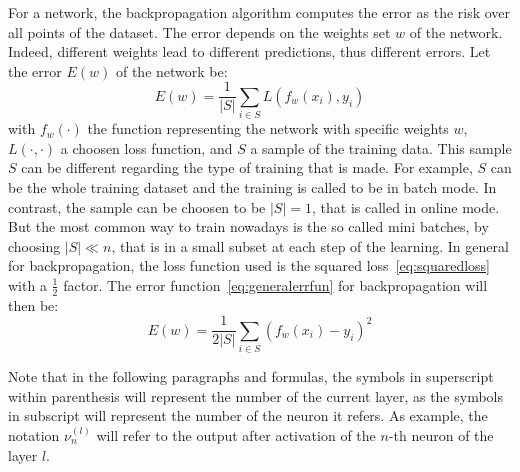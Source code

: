 For a network, the backpropagation algorithm computes the error as the risk over all points of the dataset. The error depends on the weights set $w$ of the network. Indeed, different weights lead to different predictions, thus different errors. Let the error $E(w)$ of the network be:
\begin{equation}
  \label{eq:generalerrfun}
  E(w) = \frac{1}{|S|}\sum_{i \in S} L(f_w(x_i), y_i)
\end{equation}
with $f_w(\cdot)$ the function representing the network with specific weights $w$, $L(\cdot, \cdot)$ a choosen loss function, and $S$ a sample of the training data. This sample $S$ can be different regarding the type of training that is made. For example, $S$ can be the whole training dataset and the training is called to be in batch mode. In contrast, the sample can be choosen to be $|S| = 1$, that is called in online mode. But the most common way to train nowadays is the so called mini batches, by choosing $|S| \ll n$, that is in a small subset at each step of the learning. In general for backpropagation, the loss function used is the squared loss~\eqref{eq:squaredloss} with a $\frac{1}{2}$ factor. The error function~\eqref{eq:generalerrfun} for backpropagation will then be:
\begin{equation}
  \label{eq:backerrorfunction}
  E(w) = \frac{1}{2|S|}\sum_{i \in S} (f_w(x_i) - y_i)^2
\end{equation}

Note that in the following paragraphs and formulas, the symbols in superscript within parenthesis will represent the number of the current layer, as the symbols in subscript will represent the number of the neuron it refers. As example, the notation $\nu^{(l)}_n$ will refer to the output after activation of the $n$-th neuron of the layer $l$.

